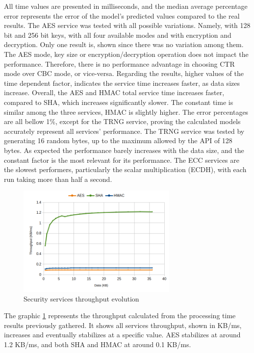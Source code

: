 All time values are presented in milliseconds, and the median average percentage error represents the error of the model's predicted values compared to the real results.
The AES service was tested with all possible variations. Namely, with 128 bit and 256 bit keys, with all four available modes and with encryption and decryption. Only one result is, shown since there was no variation among them. The AES mode, key size or encryption/decryption operation does not impact the performance. Therefore, there is no performance advantage in choosing CTR mode over CBC mode, or vice-versa.
Regarding the results, higher values of the time dependent factor, indicates the service time increases faster, as data sizes increase. Overall, the AES and HMAC total service time increases faster, compared to SHA, which increases significantly slower. The constant time is similar among the three services, HMAC is slightly higher.
The error percentages are all bellow 1\%, except for the TRNG service, proving the calculated models accurately represent all services' performance.
The TRNG service was tested by generating 16 random bytes, up to the maximum allowed by the API of 128 bytes. As expected the performance barely increases with the data size, and the constant factor is the most relevant for its performance.
The ECC services are the slowest performers, particularly the scalar multiplication (ECDH), with each run taking more than half a second.

\begin{figure}[h!]
	\centering
	\includegraphics[width=0.7\textwidth]{./Images/core-tput.png}
	\caption{Security services throughput evolution}
	\label{fig:performance:core-tput}
\end{figure}

The graphic \ref{fig:performance:core-tput} represents the throughput calculated from the processing time results previously gathered. It shows all services throughput, shown in KB/ms, increases and eventually stabilizes at a specific value. AES stabilizes at around 1.2 KB/ms, and both SHA and HMAC at around 0.1 KB/ms.

